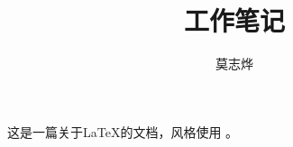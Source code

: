 \documentclass{hitec}
\title{工作笔记}
\author{莫志烨}
\begin{document}
\begin{titlepage}
\maketitle
这是一篇关于\LaTeX 的文档，风格使用 \HT 。
\end{titlepage}

%
\tableofcontents
\newpage
\newpage







\end{document}
